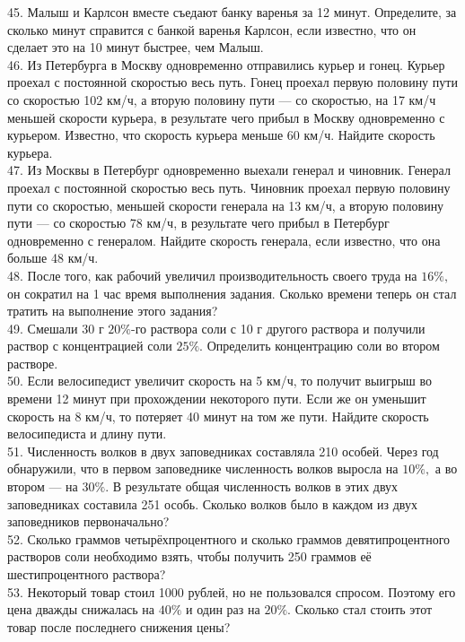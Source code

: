 45. Малыш и Карлсон вместе съедают банку варенья за 12 минут. Определите, за сколько минут справится с банкой варенья Карлсон, если известно, что он сделает это на 10 минут быстрее, чем Малыш.\\
46. Из Петербурга в Москву одновременно отправились курьер и гонец. Курьер проехал с постоянной скоростью весь путь. Гонец проехал первую половину пути со скоростью 102 км/ч, а вторую половину пути --- со скоростью, на 17 км/ч меньшей скорости курьера, в результате чего прибыл в Москву одновременно с курьером. Известно, что скорость курьера меньше 60 км/ч. Найдите скорость курьера.\\
47. Из Москвы в Петербург одновременно выехали генерал и чиновник. Генерал проехал с постоянной скоростью весь путь. Чиновник проехал первую половину пути со скоростью, меньшей скорости генерала на 13 км/ч, а вторую половину пути --- со скоростью 78 км/ч, в результате чего прибыл в Петербург одновременно с генералом. Найдите скорость генерала, если известно, что она больше 48 км/ч.\\
48. После того, как рабочий увеличил производительность своего труда на $16\%,$ он сократил на 1 час время выполнения задания. Сколько времени теперь он стал тратить на выполнение этого задания?\\
49. Смешали 30 г $20\%$-го раствора соли с 10 г другого раствора и получили раствор с концентрацией соли $25\%.$ Определить концентрацию соли во втором растворе.\\
50. Если велосипедист увеличит скорость на 5 км/ч, то получит выигрыш во времени 12 минут при прохождении некоторого пути. Если же он уменьшит скорость на 8 км/ч, то потеряет 40 минут на том же пути. Найдите скорость велосипедиста и длину пути.\\
51. Численность волков в двух заповедниках составляла 210 особей. Через год обнаружили, что в первом заповеднике численность волков выросла на $10\%,$ а во втором --- на $30\%.$ В результате общая численность волков в этих двух заповедниках составила 251 особь. Сколько волков было в каждом из двух заповедников первоначально?\\
52. Сколько граммов четырёхпроцентного и сколько граммов девятипроцентного растворов соли необходимо взять, чтобы получить 250 граммов её шестипроцентного раствора?\\
53. Некоторый товар стоил 1000 рублей, но не пользовался спросом. Поэтому его цена дважды снижалась на $40\%$ и один раз на $20\%.$ Сколько стал стоить этот товар после последнего снижения цены?\\
